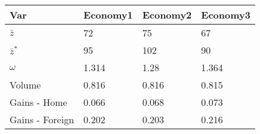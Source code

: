 \begin{tabular}{llll}
\hline
Var             & Economy1 & Economy2 & Economy3 \\ \hline
$\bar{z}$       & 72       & 75       & 67       \\
$\bar{z}^*$     & 95       & 102      & 90       \\
$\omega$        & 1.314    & 1.28     & 1.364    \\
Volume          & 0.816    & 0.816    & 0.815    \\
Gains - Home    & 0.066    & 0.068    & 0.073    \\
Gains - Foreign & 0.202    & 0.203    & 0.216    \\ \hline
\end{tabular}
